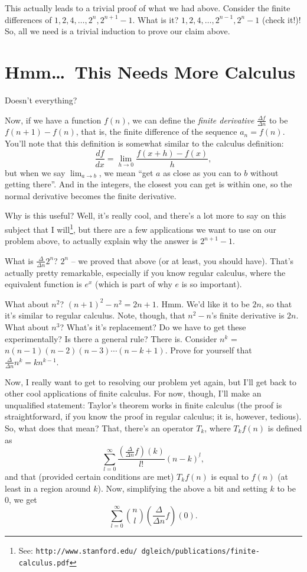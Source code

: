 \documentclass[12pt,letterpaper]{article}
\begin{document}
This actually leads to a trivial proof of what we had above. Consider
the finite differences of $1, 2, 4, \ldots, 2^n, 2^{n+1}-1$. What is
it? $1, 2, 4, \ldots, 2^{n-1}, 2^n-1$ (check it!)! So, all we need is
a trivial induction to prove our claim above.

\section{Hmm\dots\ This Needs More Calculus}
Doesn't everything?

Now, if we have a function $f(n)$, we can define the \emph{finite
derivative} $\frac{\Delta f}{\Delta n}$ to be $f(n+1)-f(n)$, that is,
the finite difference of the sequence $a_n = f(n)$. You'll note that
this definition is somewhat similar to the calculus definition:
$$\frac{df}{dx} = \lim_{h\to0}\frac{f(x+h) - f(x)}{h},$$ but when
we say $\lim_{a\to b}$, we mean ``get $a$ as close as you can to $b$
without getting there''. And in the integers, the closest you can get
is within one, so the normal derivative becomes the finite
derivative.

Why is this useful? Well, it's really cool, and there's a lot more to
say on this subject that I will\footnote{See:
\texttt{http://www.stanford.edu/\string~dgleich/publications/finite-calculus.pdf}},
but there are a few applications we want to use on our problem above,
to actually explain why the answer is $2^{n+1}-1$.

What is $\frac{\Delta}{\Delta n} 2^n$? $2^n$ -- we proved that above
(or at least, you should have). That's actually pretty remarkable,
especially if you know regular calculus, where the equivalent function
is $e^x$ (which is part of why $e$ is so important).

What about $n^2$? $(n+1)^2 - n^2 = 2n + 1$. Hmm. We'd like it to be
$2n$, so that it's similar to regular calculus. Note, though, that
$n^2 - n$'s finite derivative is $2n$. What
about $n^3$? What's it's replacement? Do we have to get these
experimentally? Is there a general rule? There is. Consider
$n^{\underbar k}$ = $n (n-1) (n-2) (n-3) \cdots (n-k+1)$. Prove for
yourself that $\frac{\Delta}{\Delta n} n^{\underbar k} = k n^{k-1}$.

Now, I really want to get to resolving our problem yet again, but I'll
get back to other cool applications of finite calculus. For now,
though, I'll make an unqualified statement: Taylor's theorem works in
finite calculus (the proof is straightforward, if you know the proof
in regular calculus; it is, however, tedious). So, what does that
mean? That, there's an operator $T_k$, where $T_k f(n)$ is defined as
$$\sum_{l=0}^{\infty} \frac{\left(\frac{\Delta}{\Delta n} f\right)(k)}{l!}
(n-k)^{\underbar l},$$ and that (provided certain conditions are met) $T_k f(n)$
is equal to $f(n)$ (at least in a region around $k$). Now, simplifying
the above a bit and setting $k$ to be 0, we get $$\sum_{l=0}^\infty
\binom{n}{l} \left(\frac{\Delta}{\Delta n} f\right)(0).$$
\end{document}
